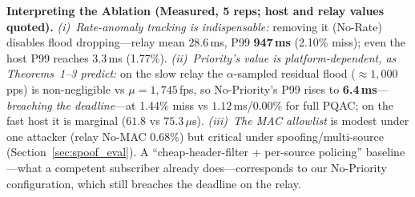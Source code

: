 \documentclass[journal]{IEEEtran}
\begin{document}
\textbf{Interpreting the Ablation (Measured, 5 reps; host and relay values quoted).} \emph{(i)~Rate-anomaly tracking is indispensable:} removing it (No-Rate) disables flood dropping---relay mean $28.6$\,ms, P99 \textbf{947\,ms} (2.10\% miss); even the host P99 reaches $3.3$\,ms (1.77\%). \emph{(ii)~Priority's value is platform-dependent, as Theorems~1--3 predict:} on the slow relay the $\alpha$-sampled residual flood ($\approx 1{,}000$\,pps) is non-negligible vs $\mu=1{,}745$\,fps, so No-Priority's P99 rises to \textbf{6.4\,ms}---\emph{breaching the deadline}---at 1.44\% miss vs $1.12$\,ms/0.00\% for full PQAC; on the fast host it is marginal ($61.8$ vs $75.3\,\mu$s). \emph{(iii)~The MAC allowlist} is modest under one attacker (relay No-MAC 0.68\%) but critical under spoofing/multi-source (Section~\ref{sec:spoof_eval}). A ``cheap-header-filter + per-source policing'' baseline---what a competent subscriber already does---corresponds to our No-Priority configuration, which still breaches the deadline on the relay.
\end{document}
